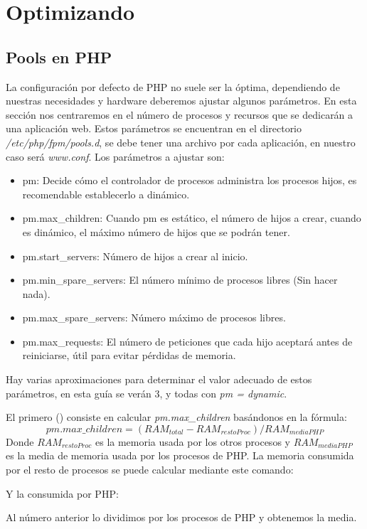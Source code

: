 \section{Optimizando}
\subsection{Pools en PHP}
La configuración por defecto de PHP no suele ser la óptima, dependiendo
de nuestras necesidades  y hardware deberemos ajustar algunos parámetros. En esta sección
nos centraremos en el número de procesos y recursos que se dedicarán a una
aplicación web. Estos parámetros se encuentran en el directorio \emph{/etc/php/fpm/pools.d},
se debe tener una archivo por cada aplicación, en nuestro caso será \emph{www.conf}.
Los parámetros a ajustar son:
\begin{itemize}
    \item pm: Decide cómo el controlador de procesos administra los procesos
    hijos, es recomendable establecerlo a dinámico.
    \item pm.max\_children: Cuando pm es estático, el número de hijos a crear,
    cuando es dinámico, el máximo número de hijos que se podrán tener.
    \item pm.start\_servers: Número de hijos a crear al inicio.
    \item pm.min\_spare\_servers: El número mínimo de procesos libres (Sin
    hacer nada).
    \item pm.max\_spare\_servers: Número máximo de procesos libres.
    \item pm.max\_requests: El número de peticiones que cada hijo aceptará
    antes de reiniciarse, útil para evitar pérdidas de memoria.
\end{itemize}
Hay varias aproximaciones para determinar el valor adecuado de estos parámetros,
en esta guía se verán 3, y todas con \emph{pm = dynamic}.

El primero (\cite{pools1}) consiste en calcular \emph{pm.max\_children} basándonos en
la fórmula:
\begin{equation}
    pm.max\_children = (RAM_{total} - RAM_{resto Proc})/ RAM_{mediaPHP}
\end{equation}
Donde $RAM_{resto Proc}$ es la memoria usada por los otros procesos y $RAM_{mediaPHP}$
es la media de memoria usada por los procesos de PHP. La memoria consumida
por el resto de procesos se puede calcular mediante este comando:
Y la consumida por PHP:
Al número anterior lo dividimos por los procesos de PHP y obtenemos la media.

